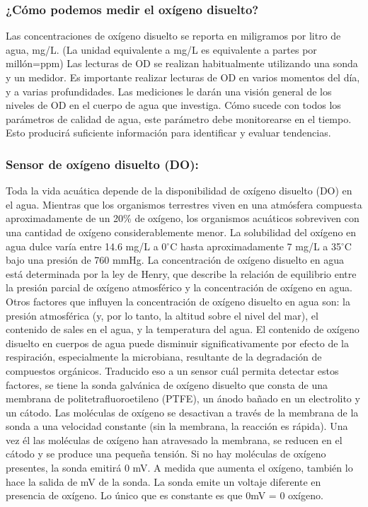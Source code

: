 \subsubsection{¿Cómo podemos medir el oxígeno disuelto?}
Las concentraciones de ox\'igeno disuelto se reporta en miligramos  por litro de agua, mg/L. (La unidad equivalente a mg/L es equivalente a partes por millón=ppm)  
Las lecturas de OD se realizan habitualmente utilizando una sonda y un medidor.
Es importante realizar lecturas de OD en varios momentos del día, y a varias profundidades. 
Las mediciones le darán una visión general de los niveles de OD en el cuerpo de agua que investiga. 
Cómo sucede con todos los parámetros de calidad de agua, este parámetro debe monitorearse en el tiempo. 
Esto producirá suficiente información para identificar y evaluar tendencias.

\subsubsection{Sensor de ox\'igeno disuelto (DO):}
Toda la vida acuática depende de la disponibilidad de oxígeno disuelto (DO) en el agua. 
Mientras que los organismos terrestres viven en una atmósfera compuesta aproximadamente de un 20\% de ox\'igeno, los organismos acuáticos sobreviven con una cantidad de ox\'igeno considerablemente menor. 
La solubilidad del ox\'igeno en agua dulce var\'ia entre 14.6 mg/L a 0$^{\circ}$C hasta aproximadamente 7 mg/L a 35$^{\circ}$C bajo una presión de 760 mmHg. La concentración de oxígeno disuelto en agua está determinada por la ley de Henry, que describe la relación de equilibrio entre la presión parcial de oxígeno atmosférico y la concentración de oxígeno en agua. 
Otros factores que influyen la concentración de oxígeno disuelto en agua son: la presión atmosférica (y, por lo tanto, la altitud sobre el nivel del mar), el contenido de sales en el agua, y la temperatura del agua. 
El contenido de ox\'igeno disuelto en cuerpos de agua puede disminuir significativamente por efecto de la respiración, especialmente la microbiana, resultante de la degradación de compuestos orgánicos. 
Traducido eso a un sensor cu\'al permita detectar estos factores, se tiene la sonda galvánica de ox\'igeno disuelto que consta de una membrana de politetrafluoroetileno (PTFE), un ánodo bañado en un electrolito y un cátodo. 
Las mol\'eculas de oxígeno se desactivan a través de la membrana de la sonda a una velocidad constante (sin la membrana, la reacción es rápida). 
Una vez \'el las mol\'eculas de ox\'igeno han atravesado la membrana, se reducen en el c\'atodo y se produce una pequeña tensión. 
Si no hay moléculas de ox\'igeno presentes, la sonda emitir\'a 0 mV. 
A medida que aumenta el ox\'igeno, tambi\'en lo hace la salida de mV de la sonda. La sonda emite un voltaje diferente en presencia de ox\'igeno. Lo \'unico que es constante es que 0mV = 0 ox\'igeno.